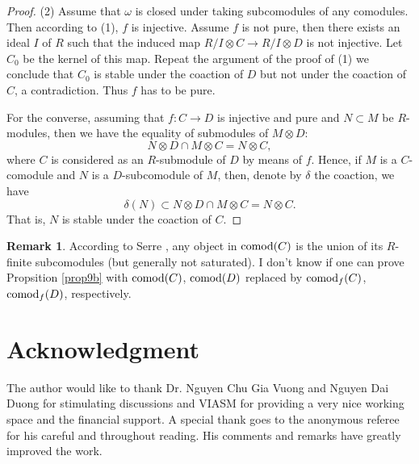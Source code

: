 \documentclass[12pt]{amsart}
\theoremstyle{plain}
\theoremstyle{definition}
\newtheorem{rmk}[thm]{Remark}
\numberwithin{thm}{section}
\def\comod{{\rm comod}}
\begin{document}
\begin{proof}
(2) Assume that $\omega$ is closed under taking subcomodules of any comodules. Then according to (1), $f$ is injective. Assume $f$ is not pure, then there exists an ideal $I$ of $R$ such that the induced map $R/I\otimes C\to R/I\otimes D$ is not injective. 
Let $C_0$ be the kernel of this map. 
Repeat the argument of the proof of (1) we conclude that $C_0$ is stable under the coaction of $D$ but not under the coaction of $C$, a contradiction. Thus $f$ has to be pure.

For the converse, assuming that $f:C\to D$ is injective and pure and $N\subset M$ be $R$-modules, then we have the equality of submodules of $M\otimes D$:
$$N\otimes D\cap M\otimes C=N\otimes C,$$
where $C$ is considered as an $R$-submodule of $D$ by means of $f$. Hence, if $M$ is a $C$-comodule and $N$ is a $D$-subcomodule of $M$, then, denote by $\delta$ the coaction, we have
$$\delta(N)\subset N\otimes D\cap M\otimes C=N\otimes C.$$
That is, $N$ is stable under the coaction of $C$.
\end{proof}

\begin{rmk}
According to Serre \cite[Prop.~2]{Se}, any object in $\comod(C)$ is the union of its $R$-finite subcomodules (but generally not saturated). I don't know if one can prove Propsition \ref{prop9b} with $\comod(C)$, $\comod(D)$ replaced by $\comod_f(C)$, $\comod_f(D)$, respectively.
\end{rmk}

\section*{Acknowledgment}
The author would like to thank Dr. Nguyen Chu Gia Vuong and Nguyen Dai Duong for stimulating discussions and VIASM for providing a very nice working space and the financial support.
A special thank goes to the anonymous referee for his careful and throughout reading. His comments and remarks have greatly improved the work.
\end{document}
